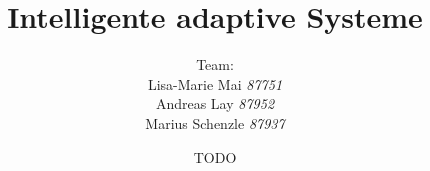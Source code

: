 

\title{\textbf{Intelligente adaptive Systeme}\\\textit{}}
\author{Team:\\Lisa-Marie Mai \textit{87751}\\Andreas Lay \textit{87952}\\Marius Schenzle \textit{87937} \vspace{10px}}
\date{TODO}


\doublespacing
{}
\maketitle
\newpage
\tableofcontents
\newpage
\singlespacing
{}


\newpage


\newpage




